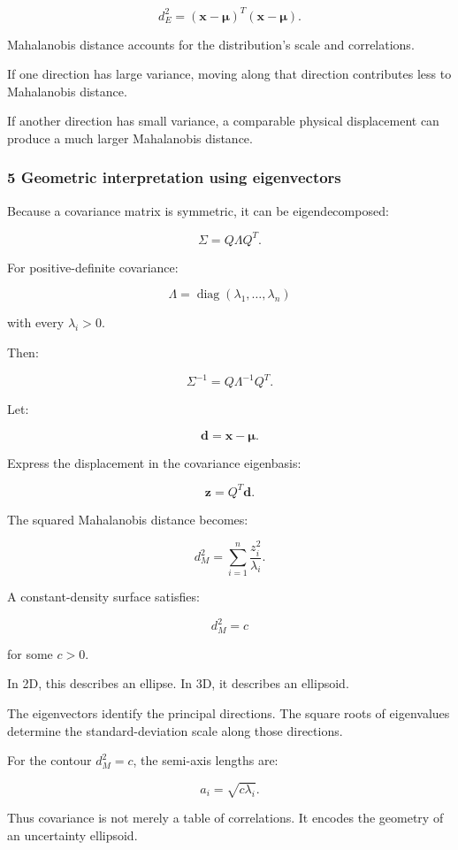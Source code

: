\[
 d_E^2= (\mathbf x-\boldsymbol\mu)^T (\mathbf x-\boldsymbol\mu).
\]

Mahalanobis distance accounts for the distribution's scale and correlations.

If one direction has large variance, moving along that direction contributes less to Mahalanobis distance.

If another direction has small variance, a comparable physical displacement can produce a much larger Mahalanobis distance.

\subsubsection{5 Geometric interpretation using eigenvectors}\label{02-foundations-ii-ch024-geometric-interpretation-using-eigenvectors}

Because a covariance matrix is symmetric, it can be eigendecomposed:

\[
 \Sigma=Q\Lambda Q^T.
\]

For positive-definite covariance:

\[
 \Lambda= \operatorname{diag}(\lambda_1,\ldots,\lambda_n)
\]

with every \(\lambda_i>0\).

Then:

\[
 \Sigma^{-1}=Q\Lambda^{-1}Q^T.
\]

Let:

\[
 \mathbf d=\mathbf x-\boldsymbol\mu.
\]

Express the displacement in the covariance eigenbasis:

\[
 \mathbf z=Q^T\mathbf d.
\]

The squared Mahalanobis distance becomes:

\[
 \boxed{ d_M^2= \sum_{i=1}^{n}\frac{z_i^2}{\lambda_i} }.
\]

A constant-density surface satisfies:

\[
 d_M^2=c
\]

for some \(c>0\).

In 2D, this describes an ellipse. In 3D, it describes an ellipsoid.

The eigenvectors identify the principal directions. The square roots of eigenvalues determine the standard-deviation scale along those directions.

For the contour \(d_M^2=c\), the semi-axis lengths are:

\[
 \boxed{ a_i=\sqrt{c\lambda_i} }.
\]

Thus covariance is not merely a table of correlations. It encodes the geometry of an uncertainty ellipsoid.

